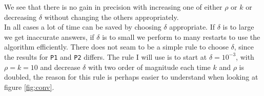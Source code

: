 We see that there is no gain in precision with increasing one of either $\rho$ or $k$ or decreasing $\delta$ without changing the others appropriately. \\

In all cases a lot of time can be saved by choosing $\delta$ appropriate. If $\delta$ is to large we get inaccurate answers, if $\delta$ is to small we perform to many restarts to use the algorithm efficiently. There does not seam to be a simple rule to choose $\delta$, since the results for \texttt{P1} and \texttt{P2} differs. The rule I will use is to start at $\delta=10^{-3}$, with $\rho = k = 10$ and decrease $\delta$ with two order of magnitude each time $k$ and $\rho$ is doubled, the reason for this rule is perhaps easier to understand when looking at figure \ref{fig:conv}.